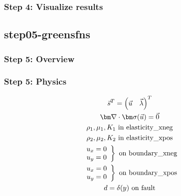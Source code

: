 \documentclass{beamer}
\begin{document}
\begin{frame}
  \frametitle{Step 4: Visualize results}

    
\end{frame}


\subsection{step05-greensfns}

\begin{frame}
  \frametitle{Step 5: Overview}

      
\end{frame}

\begin{frame}
  \frametitle{Step 5: Physics}
  \summary{}

  \begin{minipage}{0.35\textwidth}
    {\scriptsize
    \begin{gather*}
    \vec{s}^T = \left( \vec{u} \quad \vec{\lambda} \right)^T \\
    \tensor{\nabla} \cdot \tensor{\sigma}(\vec{u}) = \vec{0} \\
    \rho_1, \mu_1, K_1 \text{ in elasticity\_xneg} \\ 
    \rho_2, \mu_2, K_2 \text{ in elasticity\_xpos} \\ 
    \left. \begin{array}{c} u_x = 0 \\ u_y = 0 \end{array}\right\} \text{ on boundary\_xneg} \\
    \left. \begin{array}{c} u_x = 0 \\ u_y = 0 \end{array}\right\} \text{ on boundary\_xpos} \\
    d = \delta(y) \text{ on fault}
    \end{gather*}}
  \end{minipage}
  \hfill
  \begin{minipage}{0.60\textwidth}
  \end{minipage}
      
\end{frame}
\end{document}
